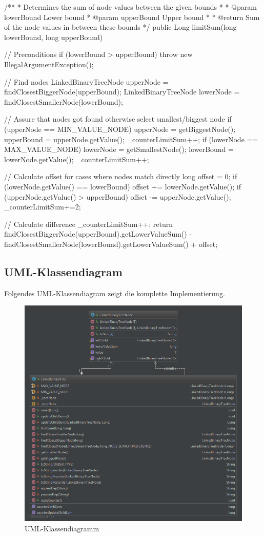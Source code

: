 \documentclass[paper=a4, fontsize=12pt]{article}
\begin{document}
\begin{javacode}
/**
 * Determines the sum of node values between the given bounds
 *
 * @param lowerBound Lower bound
 * @param upperBound Upper bound
 *
 * @return Sum of the node values in between these bounds
 */
public Long limitSum(long lowerBound, long upperBound) {
	// Preconditions
	if (lowerBound > upperBound)
	throw new IllegalArgumentException();
	
	// Find nodes
	LinkedBinaryTreeNode upperNode = findClosestBiggerNode(upperBound);
	LinkedBinaryTreeNode lowerNode = findClosestSmallerNode(lowerBound);
	
	// Assure that nodes got found otherwise select smallest/biggest node
	if (upperNode == MIN_VALUE_NODE) {
		upperNode = getBiggestNode();
		upperBound = upperNode.getValue();
		_counterLimitSum++;
	}
	if (lowerNode == MAX_VALUE_NODE) {
		lowerNode = getSmallestNode();
		lowerBound = lowerNode.getValue();
		_counterLimitSum++;
	}
	
	// Calculate offset for cases where nodes match directly
	long offset = 0;
	if (lowerNode.getValue() == lowerBound)
	offset += lowerNode.getValue();
	if (upperNode.getValue() > upperBound)
	offset -= upperNode.getValue();
	_counterLimitSum+=2;
	
	// Calculate difference
	_counterLimitSum++;
	return findClosestBiggerNode(upperBound).getLowerValueSum() - findClosestSmallerNode(lowerBound).getLowerValueSum() + offset;
}
\end{javacode}

\newpage
\subsection{UML-Klassendiagram}
Folgendes UML-Klassendiagram zeigt die komplette Implementierung.

\begin{figure}[H]
	\centering
	\includegraphics[scale=0.5]{classdiagram.png}
	\caption{UML-Klassendiagramm}
\end{figure}
\end{document}
